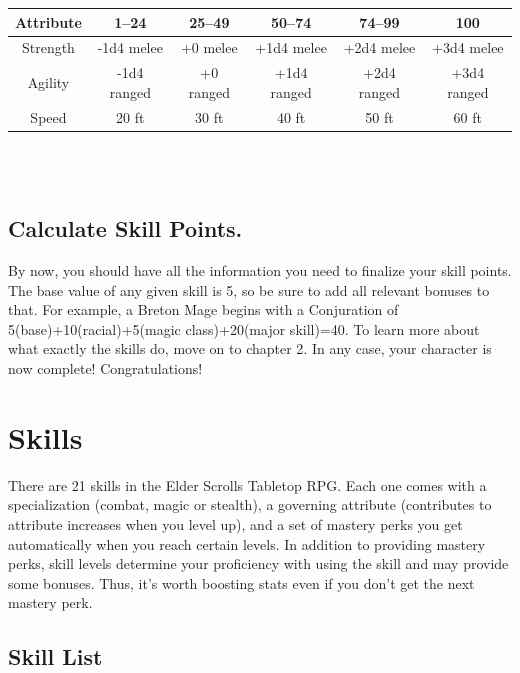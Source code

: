 \documentclass[12pt]{book}
\begin{document}
\begin{tabular}{|c|c|c|c|c|c|}
\hline
Attribute & 1--24 & 25--49 & 50--74 & 74--99 & 100\\ \hline
Strength & -1d4 melee & +0 melee & +1d4 melee & +2d4 melee & +3d4 melee\\ \hline
Agility & -1d4 ranged & +0 ranged & +1d4 ranged & +2d4 ranged & +3d4 ranged\\ \hline
Speed & 20 ft & 30 ft & 40 ft & 50 ft & 60 ft\\ \hline

\end{tabular}\\~\\

\section{Calculate Skill Points.}
By now, you should have all the information you need to finalize your skill points. The base value of any given skill is 5, so be sure to add all relevant bonuses to that. For example, a Breton Mage begins with a Conjuration of 5(base)+10(racial)+5(magic class)+20(major skill)=40. To learn more about what exactly the skills do, move on to chapter 2. In any case, your character is now complete! Congratulations!

\chapter{Skills}

There are 21 skills in the Elder Scrolls Tabletop RPG. Each one comes with a specialization (combat, magic or stealth), a governing attribute (contributes to attribute increases when you level up), and a set of mastery perks you get automatically when you reach certain levels. In addition to providing mastery perks, skill levels determine your proficiency with using the skill and may provide some bonuses. Thus, it's worth boosting stats even if you don't get the next mastery perk.

\section{Skill List}
\end{document}
